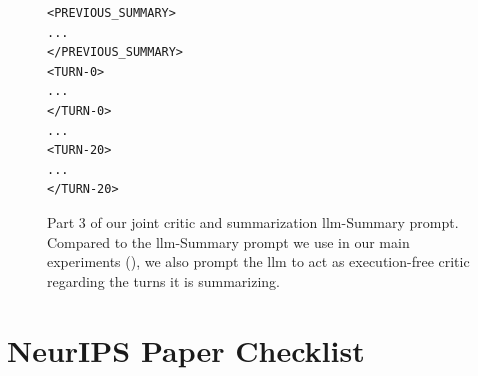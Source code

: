 \documentclass{article}
\begin{document}
\begin{figure}[th]
\begin{tcolorbox}[
  colback=jb_magenta_accent,
  colframe=jb_magenta,
  title=Joint Critic-Summary Prompt (Part 3), width=\textwidth
]
\begin{small}
\begin{verbatim}
<PREVIOUS_SUMMARY>
...
</PREVIOUS_SUMMARY>
<TURN-0>
...
</TURN-0>
...
<TURN-20>
...
</TURN-20>
\end{verbatim}
\end{small}
\end{tcolorbox}
\caption{Part 3 of our joint critic and summarization \ac{llm}-Summary prompt. Compared to the \ac{llm}-Summary prompt we use in our main experiments (), we also prompt the \ac{llm} to act as execution-free critic regarding the turns it is summarizing.}
\label{fig:prompt:llm-critic-3}
\end{figure}


\clearpage
\section*{NeurIPS Paper Checklist}


\end{document}
